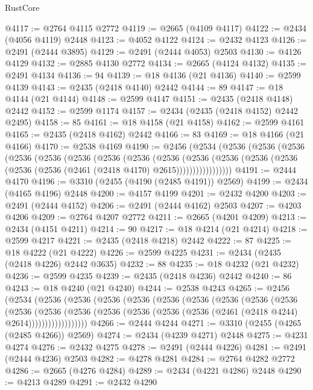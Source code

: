 \begin{lexlean}{RustCore}
\begin{coremodule}
@4117 := @2764 @4115 @2772
@4119 := @2665 (@4109 @4117)
@4122 := @2434 (@4056 @4119) @2448
@4123 := @4052 @4122
@4124 := @2432 @4123
@4126 := @2491 (@2444 @3895)
@4129 := @2491 (@2444 @4053) @2503
@4130 := @4126 @4129
@4132 := @2885 @4130 @2772
@4134 := @2665 (@4124 @4132)
@4135 := @2491 @4134
@4136 := 94
@4139 := @18 @4136 (@21 @4136)
@4140 := @2599 @4139
@4143 := @2435 (@2418 @4140) @2442
@4144 := 89
@4147 := @18 @4144 (@21 @4144)
@4148 := @2599 @4147
@4151 := @2435 (@2418 @4148) @2442
@4152 := @2599 @1174
@4157 := @2434 (@2435 (@2418 @4152) @2442 @2495)
@4158 := 85
@4161 := @18 @4158 (@21 @4158)
@4162 := @2599 @4161
@4165 := @2435 (@2418 @4162) @2442
@4166 := 83
@4169 := @18 @4166 (@21 @4166)
@4170 := @2538 @4169
@4190 := @2456
    (@2534
      (@2536
        (@2536
          (@2536
            (@2536
              (@2536
                (@2536
                  (@2536
                    (@2536
                      (@2536
                        (@2536
                          (@2536
                            (@2536 (@2536 (@2536 (@2536 (@2461 (@2418 @4170) @2615)))))))))))))))))
@4191 := @2444 @4170
@4196 := @3310 (@2455 (@4190 (@2485 @4191)) @2569)
@4199 := @2434 (@4165 @4196) @2448
@4200 := @4157 @4199
@4201 := @2432 @4200
@4203 := @2491 (@2444 @4152)
@4206 := @2491 (@2444 @4162) @2503
@4207 := @4203 @4206
@4209 := @2764 @4207 @2772
@4211 := @2665 (@4201 @4209)
@4213 := @2434 (@4151 @4211)
@4214 := 90
@4217 := @18 @4214 (@21 @4214)
@4218 := @2599 @4217
@4221 := @2435 (@2418 @4218) @2442
@4222 := 87
@4225 := @18 @4222 (@21 @4222)
@4226 := @2599 @4225
@4231 := @2434 (@2435 (@2418 @4226) @2442 @3635)
@4232 := 88
@4235 := @18 @4232 (@21 @4232)
@4236 := @2599 @4235
@4239 := @2435 (@2418 @4236) @2442
@4240 := 86
@4243 := @18 @4240 (@21 @4240)
@4244 := @2538 @4243
@4265 := @2456
    (@2534
      (@2536
        (@2536
          (@2536
            (@2536
              (@2536
                (@2536
                  (@2536
                    (@2536
                      (@2536
                        (@2536
                          (@2536
                            (@2536
                              (@2536
                                (@2536 (@2536 (@2536 (@2461 (@2418 @4244) @2614))))))))))))))))))
@4266 := @2444 @4244
@4271 := @3310 (@2455 (@4265 (@2485 @4266)) @2569)
@4274 := @2434 (@4239 @4271) @2448
@4275 := @4231 @4274
@4276 := @2432 @4275
@4278 := @2491 (@2444 @4226)
@4281 := @2491 (@2444 @4236) @2503
@4282 := @4278 @4281
@4284 := @2764 @4282 @2772
@4286 := @2665 (@4276 @4284)
@4289 := @2434 (@4221 @4286) @2448
@4290 := @4213 @4289
@4291 := @2432 @4290

\end{coremodule}
\end{lexlean}
